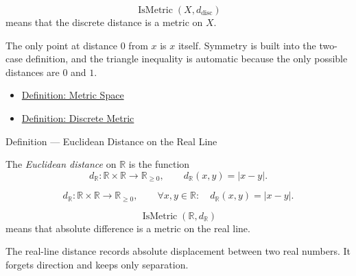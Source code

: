 \begin{remark*}
\[
\operatorname{IsMetric}(X,d_{\mathrm{disc}})
\]
means that the discrete distance is a metric on \(X\).
\end{remark*}

\begin{remark*}[Interpretation]
The only point at distance \(0\) from \(x\) is \(x\) itself.  Symmetry is built
into the two-case definition, and the triangle inequality is automatic because
the only possible distances are \(0\) and \(1\).
\end{remark*}

\begin{dependencies}
\begin{itemize}
  \item \hyperref[def:metric-space]{Definition: Metric Space}
  \item \hyperref[def:discrete-metric]{Definition: Discrete Metric}
\end{itemize}
\end{dependencies}

\begin{definitionbox}{Definition --- Euclidean Distance on the Real Line}
\begin{definition}
\label{def:real-line-euclidean-distance}
The \emph{Euclidean distance} on \(\mathbb{R}\) is the function
\[
  d_{\mathbb{R}}:\mathbb{R}\times\mathbb{R}\to\mathbb{R}_{\geq 0},
  \qquad
  d_{\mathbb{R}}(x,y)=|x-y|.
\]
\end{definition}
\end{definitionbox}

\begin{remark*}
\[
d_{\mathbb{R}}:\mathbb{R}\times\mathbb{R}\to\mathbb{R}_{\geq 0},
\qquad
\forall x,y\in\mathbb{R}{:}\quad d_{\mathbb{R}}(x,y)=|x-y|.
\]
\end{remark*}

\begin{remark*}
\[
\operatorname{IsMetric}(\mathbb{R},d_{\mathbb{R}})
\]
means that absolute difference is a metric on the real line.
\end{remark*}

\begin{remark*}[Interpretation]
The real-line distance records absolute displacement between two real numbers.
It forgets direction and keeps only separation.
\end{remark*}


